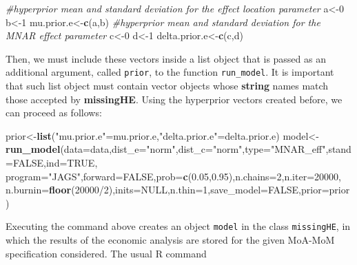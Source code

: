 \documentclass[]{article}
\newenvironment{Shaded}{\begin{snugshade}}{\end{snugshade}}
\newcommand{\KeywordTok}[1]{\textcolor[rgb]{0.13,0.29,0.53}{\textbf{{#1}}}}
\newcommand{\DataTypeTok}[1]{\textcolor[rgb]{0.13,0.29,0.53}{{#1}}}
\newcommand{\DecValTok}[1]{\textcolor[rgb]{0.00,0.00,0.81}{{#1}}}
\newcommand{\FloatTok}[1]{\textcolor[rgb]{0.00,0.00,0.81}{{#1}}}
\newcommand{\StringTok}[1]{\textcolor[rgb]{0.31,0.60,0.02}{{#1}}}
\newcommand{\CommentTok}[1]{\textcolor[rgb]{0.56,0.35,0.01}{\textit{{#1}}}}
\newcommand{\OtherTok}[1]{\textcolor[rgb]{0.56,0.35,0.01}{{#1}}}
\newcommand{\NormalTok}[1]{{#1}}
\begin{document}
\begin{Shaded}
\begin{Highlighting}[]
\CommentTok{#hyperprior mean and standard deviation for the effect location parameter}
\NormalTok{a<-}\DecValTok{0}
\NormalTok{b<-}\DecValTok{1}
\NormalTok{mu.prior.e<-}\KeywordTok{c}\NormalTok{(a,b)}
\CommentTok{#hyperprior mean and standard deviation for the MNAR effect parameter}
\NormalTok{c<-}\DecValTok{0}
\NormalTok{d<-}\DecValTok{1}
\NormalTok{delta.prior.e<-}\KeywordTok{c}\NormalTok{(c,d)}
\end{Highlighting}
\end{Shaded}

Then, we must include these vectors inside a list object that is passed
as an additional argument, called \texttt{prior}, to the function
\texttt{run\_model}. It is important that such list object must contain
vector objects whose \textbf{string} names match those accepted by
\textbf{missingHE}. Using the hyperprior vectors created before, we can
proceed as follows:

\begin{Shaded}
\begin{Highlighting}[]
\NormalTok{prior<-}\KeywordTok{list}\NormalTok{(}\StringTok{"mu.prior.e"}\NormalTok{=mu.prior.e,}\StringTok{"delta.prior.e"}\NormalTok{=delta.prior.e)}
\NormalTok{model<-}\KeywordTok{run_model}\NormalTok{(}\DataTypeTok{data=}\NormalTok{data,}\DataTypeTok{dist_e=}\StringTok{"norm"}\NormalTok{,}\DataTypeTok{dist_c=}\StringTok{"norm"}\NormalTok{,}\DataTypeTok{type=}\StringTok{"MNAR_eff"}\NormalTok{,}\DataTypeTok{stand=}\OtherTok{FALSE}\NormalTok{,}\DataTypeTok{ind=}\OtherTok{TRUE}\NormalTok{,}
                 \DataTypeTok{program=}\StringTok{"JAGS"}\NormalTok{,}\DataTypeTok{forward=}\OtherTok{FALSE}\NormalTok{,}\DataTypeTok{prob=}\KeywordTok{c}\NormalTok{(}\FloatTok{0.05}\NormalTok{,}\FloatTok{0.95}\NormalTok{),}\DataTypeTok{n.chains=}\DecValTok{2}\NormalTok{,}\DataTypeTok{n.iter=}\DecValTok{20000}\NormalTok{,}
                 \DataTypeTok{n.burnin=}\KeywordTok{floor}\NormalTok{(}\DecValTok{20000}\NormalTok{/}\DecValTok{2}\NormalTok{),}\DataTypeTok{inits=}\OtherTok{NULL}\NormalTok{,}\DataTypeTok{n.thin=}\DecValTok{1}\NormalTok{,}\DataTypeTok{save_model=}\OtherTok{FALSE}\NormalTok{,}\DataTypeTok{prior=}\NormalTok{prior)}
\end{Highlighting}
\end{Shaded}

Executing the command above creates an object \texttt{model} in the
class \texttt{missingHE}, in which the results of the economic analysis
are stored for the given MoA-MoM specification considered. The usual R
command
\end{document}

